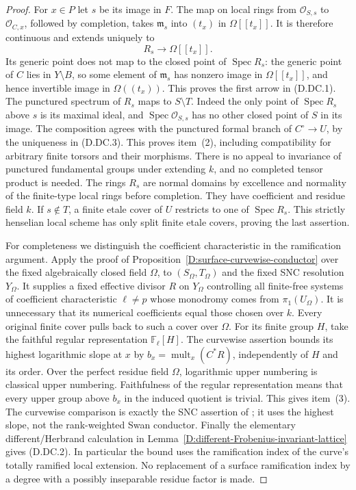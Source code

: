 \begin{proof}
For $x\in P$ let $s$ be its image in $F$. The map on local rings
from $\mathcal O_{S,s}$ to $\mathcal O_{C,x}$, followed by completion,
takes $\mathfrak m_s$ into $(t_x)$ in $\Omega[[t_x]]$.
It is therefore continuous and extends uniquely to
\[
                 R_s\longrightarrow\Omega[[t_x]].          \tag{D.DC.3}
\]
Its generic point does not map to the closed point of
$\operatorname{Spec}R_s$: the generic point of $C$ lies in
$Y\setminus B$, so some element of $\mathfrak m_s$ has nonzero
image in $\Omega[[t_x]]$, and hence invertible image in
$\Omega((t_x))$. This proves the first arrow in (D.DC.1).
The punctured spectrum of $R_s$ maps to $S\setminus T$.
Indeed the only point of $\operatorname{Spec}R_s$ above $s$
is its maximal ideal, and $\operatorname{Spec}\mathcal O_{S,s}$
has no other closed point of $S$ in its image. The composition
agrees with the punctured formal branch of $C^\circ\to U$,
by the uniqueness in (D.DC.3). This proves item~(2), including
compatibility for arbitrary finite torsors and their morphisms.
There is no appeal to invariance of punctured fundamental groups
under extending $k$, and no completed tensor product is needed.
The rings $R_s$ are normal domains by excellence and normality
of the finite-type local rings before completion. They have
coefficient and residue field $k$.
If $s\notin T$, a finite etale cover of $U$ restricts to one of
$\operatorname{Spec}R_s$. This strictly henselian local scheme
has only split finite etale covers, proving the last assertion.

For completeness we distinguish the coefficient characteristic
in the ramification argument. Apply the proof of
Proposition~\ref{D:surface-curvewise-conductor} over the fixed
algebraically closed field $\Omega$, to $(S_\Omega,T_\Omega)$
and the fixed SNC resolution $Y_\Omega$. It supplies a fixed
effective divisor $R$ on $Y_\Omega$ controlling all finite-free
systems of coefficient characteristic $\ell\ne p$ whose
monodromy comes from $\pi_1(U_\Omega)$. It is unnecessary
that its numerical coefficients equal those chosen over $k$.
Every original finite cover pulls back to such a cover over
$\Omega$. For its finite group $H$, take the faithful regular
representation $\mathbb F_\ell[H]$. The curvewise assertion
bounds its highest logarithmic slope at $x$ by
$b_x=\operatorname{mult}_x(C^*R)$, independently of $H$ and
its order. Over the perfect residue field $\Omega$, logarithmic
upper numbering is classical upper numbering. Faithfulness of
the regular representation means that every upper group above
$b_x$ in the induced quotient is trivial. This gives item~(3).
The curvewise comparison is exactly the SNC assertion of
\citet[Theorem~3.5, Remark~3.9 and Proposition~5.8(3)]
{C_HuTeyssierRam2025}; it uses the highest slope, not the
rank-weighted Swan conductor. Finally the elementary
different/Herbrand calculation in
Lemma~\ref{D:different-Frobenius-invariant-lattice} gives
(D.DC.2). In particular the bound uses the ramification index
of the curve's totally ramified local extension. No replacement
of a surface ramification index by a degree with a possibly
inseparable residue factor is made.
\end{proof}
